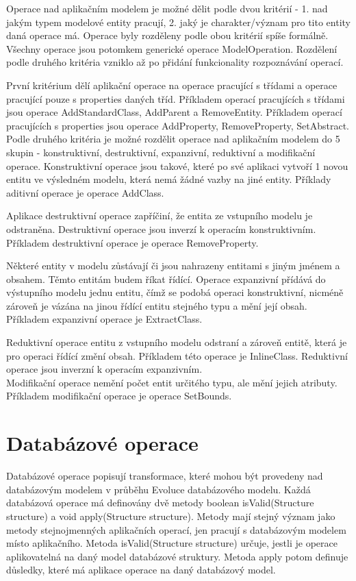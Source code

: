 \documentclass[11pt,twoside,a4paper]{book}
\begin{document}
Operace nad aplikačním modelem je možné dělit podle dvou kritérií - 1. nad jakým
typem modelové entity pracují, 2. jaký je charakter/význam pro tito entity daná
operace má. Operace byly rozděleny podle obou kritérií spíše formálně. Všechny operace
jsou potomkem generické operace ModelOperation. Rozdělení podle druhého kritéria
vzniklo až po přidání funkcionality rozpoznávání operací.

První kritérium dělí aplikační operace na operace pracující s třídami a operace
pracující pouze s properties daných tříd. Příkladem operací pracujících s
třídami jsou operace AddStandardClass, AddParent a RemoveEntity. Příkladem
operací pracujících s properties jsou operace AddProperty, RemoveProperty,
SetAbstract.\\

Podle druhého kritéria je možné rozdělit operace nad aplikačním modelem do 5
skupin - konstruktivní, destruktivní, expanzivní, reduktivní a modifikační operace.
Konstruktivní operace jsou takové, které po své aplikaci vytvoří 1 novou entitu
ve výsledném modelu, která nemá žádné vazby na jiné entity. Příklady aditivní
operace je operace AddClass. 

Aplikace destruktivní operace zapříčiní, že entita ze vstupního modelu
je odstraněna. Destruktivní operace jsou inverzí k operacím konstruktivním.
Příkladem destruktivní operace je operace RemoveProperty.

Některé entity v modelu zůstávají či jsou nahrazeny entitami s jiným jménem a
 obsahem. Těmto entitám budem říkat řídící. Operace expanzivní
přídává do výstupního modelu jednu entitu, čímž se podobá operaci konstruktivní,
nicméně zároveň je vázána na jinou řídící entitu stejného typu a mění její
obsah. Příkladem expanzivní operace je ExtractClass.

Reduktivní operace entitu z vstupního modelu odstraní a zároveň entitě, která
je pro operaci řídící změní obsah. Příkladem této operace je InlineClass.
Reduktivní operace jsou inverzní k operacím expanzivním.\\

Modifikační operace nemění počet entit určitého typu, ale mění jejich atributy.
Příkladem modifikační operace je operace SetBounds.

\section{Databázové operace} \label{db_ops}

Databázové operace popisují transformace, které mohou být provedeny nad
databázovým modelem v průběhu Evoluce databázového modelu. Každá databázová
operace má definovány dvě metody boolean isValid(Structure structure) a
void apply(Structure structure). Metody mají stejný význam jako metody
stejnojmenných aplikačních operací, jen pracují s databázovým modelem místo
aplikačního. Metoda isValid(Structure structure) určuje, jestli je operace
aplikovatelná na daný model databázové struktury. Metoda apply potom definuje
důsledky, které má aplikace operace na daný databázový model.
\end{document}
